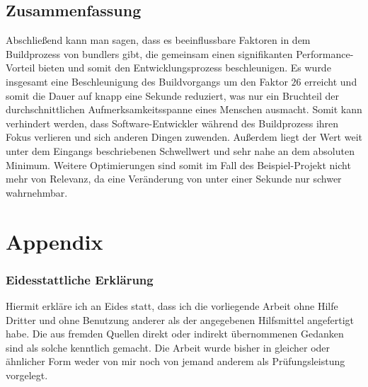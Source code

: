 \documentclass[11pt]{report}
\newcommand*{\SignatureAndDate}[1]{%
    \par\noindent\makebox[2.5in]{\hrulefill}
           \hfill\makebox[2.0in]{\hrulefill}
    \par\noindent\makebox[2.5in][l]{#1}
           \hfill\makebox[2.0in][l]{Datum}
}
\begin{document}
		\section{Zusammenfassung}
			Abschließend kann man sagen, dass es beeinflussbare Faktoren in dem Buildprozess von \Glspl{bundler} gibt, die gemeinsam einen signifikanten Performance-Vorteil bieten und somit den Entwicklungsprozess beschleunigen. Es wurde insgesamt eine Beschleunigung des Buildvorgangs um den Faktor $26$ erreicht und somit die Dauer auf knapp eine Sekunde reduziert, was nur ein Bruchteil der durchschnittlichen Aufmerksamkeitsspanne eines Menschen ausmacht. Somit kann verhindert werden, dass Software-Entwickler während des Buildprozess ihren Fokus verlieren und sich anderen Dingen zuwenden. Außerdem liegt der Wert weit unter dem Eingangs beschriebenen Schwellwert und sehr nahe an dem absoluten Minimum. Weitere Optimierungen sind somit im Fall des Beispiel-Projekt nicht mehr von Relevanz, da eine Veränderung von unter einer Sekunde nur schwer wahrnehmbar.
			
    \pagebreak

    \chapter{Appendix}
	    \hspace{0pt}
    \vfill
    \subsection*{Eidesstattliche Erklärung}
        Hiermit erkläre ich an Eides statt, dass ich die vorliegende Arbeit ohne Hilfe Dritter und ohne Benutzung anderer als der angegebenen Hilfsmittel angefertigt habe. Die aus fremden Quellen direkt oder indirekt übernommenen Gedanken sind als solche kenntlich gemacht. Die Arbeit wurde bisher in gleicher oder ähnlicher Form weder von mir noch von jemand anderem als Prüfungsleistung vorgelegt.
        \vspace{2cm}
        \SignatureAndDate{Unterschrift}
    \vfill
    \hspace{0pt}
    
    \clearpage
    
\end{document}

